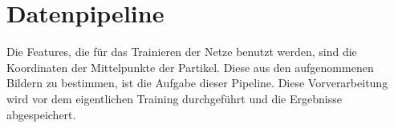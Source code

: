 \section{Datenpipeline} \label{sec:pipeline}


Die Features, die für das Trainieren der Netze benutzt werden, sind die Koordinaten der Mittelpunkte der Partikel.
Diese aus den aufgenommenen Bildern zu bestimmen, ist die Aufgabe dieser Pipeline. 
Diese Vorverarbeitung wird vor dem eigentlichen Training durchgeführt und die Ergebnisse abgespeichert.

